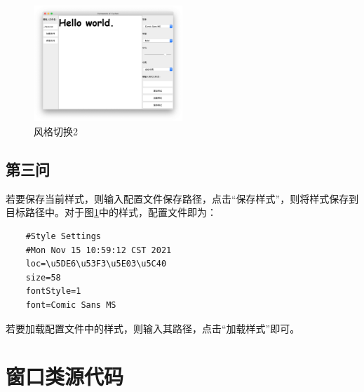 \documentclass[11pt]{homework}
\begin{document}
  \begin{figure}
    \centering
    \includegraphics[width=0.5\textwidth]{风格切换2}
    \caption{风格切换2}
    \label{风格切换2}
  \end{figure}

  \subsection*{第三问}

  若要保存当前样式，则输入配置文件保存路径，点击“保存样式”，则将样式保存到目标路径中。对于图\ref{风格切换2}中的样式，配置文件即为：
  \begin{lstlisting}
    #Style Settings
    #Mon Nov 15 10:59:12 CST 2021
    loc=\u5DE6\u53F3\u5E03\u5C40
    size=58
    fontStyle=1
    font=Comic Sans MS
  \end{lstlisting}

  若要加载配置文件中的样式，则输入其路径，点击“加载样式”即可。

\section*{窗口类源代码}
\end{document}
